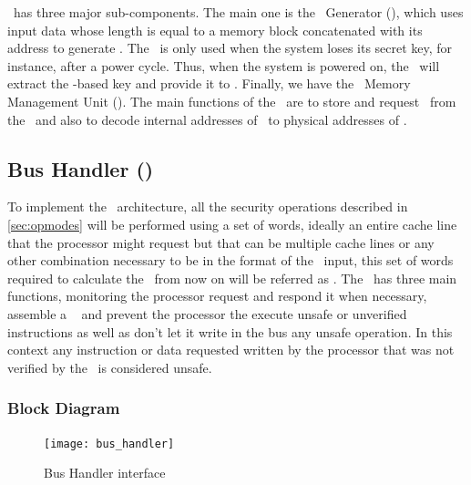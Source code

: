 \seceng~has three major sub-components. The main one is the \ptag~Generator (\ptaggen), which uses input data whose length is equal to a memory block concatenated with its address to generate \ptags. The \fuzzy~is only used when the system loses its secret key, for instance, after a power cycle. Thus, when the system is powered on, the \fuzzy~will extract the \puf-based key and provide it to \ptaggen. Finally, we have the \ptag~Memory Management Unit (\pmmu). The main functions of the \pmmu~are to store and request \ptags~from the \ptagmem~and also to decode internal addresses of \ptags~to physical addresses of \ptagmem. 


\subsection{Bus Handler (\handler)}
\label{subsec:bushandler}
To implement the \cshia~architecture, all the security operations described in \ref{sec:opmodes} will be performed using a set of words, ideally an entire cache line that the processor might request but that can be multiple cache lines or any other combination necessary to be in the format of the \seceng~input, this set of words required to calculate the \ptags~from now on will be referred as \sline.  The \handler~has three main functions, monitoring the processor request and respond it when necessary, assemble a \sline~ and prevent the processor the execute unsafe or unverified instructions  as well as don't let  it  write in the bus any unsafe operation. In this context any instruction or data requested written by the processor that was not verified by the \seceng~is considered unsafe.



\subsubsection{Block Diagram}

\begin{figure}[!ht]
    \centering
    \texttt{[image: bus\_handler]}
    \caption{Bus Handler  interface }
    \label{fig:bhbb}
\end{figure}


